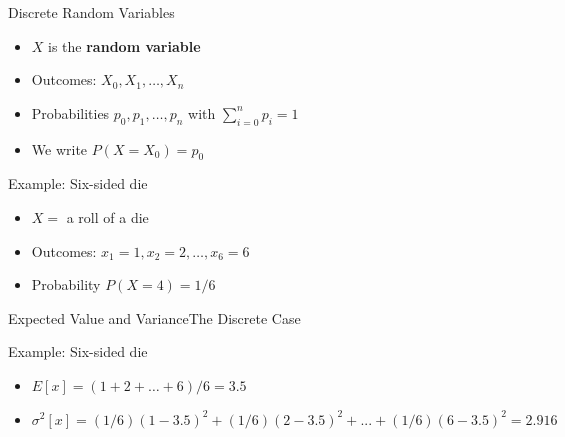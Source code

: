 \documentclass[10pt]{beamer}
\begin{document}
\begin{frame}{Discrete Random Variables}

{}

\begin{itemize}
  \item $X$ is the \textbf{random variable}
  \item Outcomes: $X_0, X_1, \dots, X_n$
  \item Probabilities $p_0, p_1,\dots,p_n$ with $\sum_{i=0}^{n}p_i = 1$
  \item We write $P(X=X_0) = p_0$
\end{itemize}

\begin{block}{Example: Six-sided die}
\begin{itemize}
    \item $X =$ a roll of a die
    \item Outcomes: $x_1=1, x_2=2, \dots, x_6=6$
    \item Probability $P(X=4) = 1/6$
\end{itemize}

\end{block}  
\end{frame}
\begin{frame}{Expected Value and Variance}{The Discrete Case}

{}

\begin{block}{Example: Six-sided die}
\begin{itemize}
  \item $E[x] = (1+2+\dots+6)/6 = 3.5$
  \item $\sigma^2[x] = (1/6)(1 - 3.5)^2 + (1/6)(2-3.5)^2 + ... + (1/6)(6 - 3.5)^2 = 2.916$
\end{itemize}
\end{block}  
\end{frame}
\end{document}
